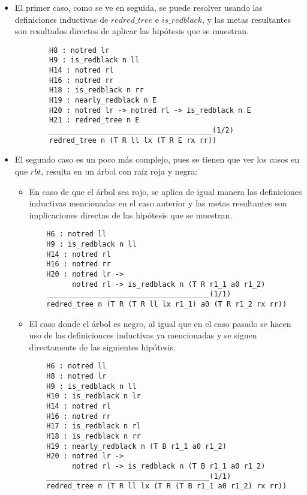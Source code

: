 \begin{itemize}
    \item El primer caso, como se ve en seguida, se puede resolver usando las definiciones
    inductivas de \hyperref[inductive_isRedB]{$redred\_tree$} e 
    \hyperref[inductive_isRedB]{$is\_redblack$}, y las metas resultantes son resultados directos de 
    aplicar las hipótesis que se muestran.
    \begin{verbatim}
        H8 : notred lr
        H9 : is_redblack n ll
        H14 : notred rl
        H16 : notred rr
        H18 : is_redblack n rr
        H19 : nearly_redblack n E
        H20 : notred lr -> notred rl -> is_redblack n E
        H21 : redred_tree n E
        ______________________________________(1/2)
        redred_tree n (T R ll lx (T R E rx rr))
    \end{verbatim}
    \item El segundo caso es un poco m\'as complejo, pues se tienen que ver los casos en que $rbt$,
    resulta en un \'arbol con raíz roja y negra:
    \begin{itemize}
        \item En caso de que el \'arbol sea rojo, se aplica de igual manera las definiciones
        inductivas mencionadas en el caso anterior y las metas resultantes son implicaciones
        directas de las hipótesis que se muestran.
    \begin{verbatim}
    H6 : notred ll
    H9 : is_redblack n ll
    H14 : notred rl
    H16 : notred rr
    H20 : notred lr ->
          notred rl -> is_redblack n (T R r1_1 a0 r1_2)
    ______________________________________(1/1)
    redred_tree n (T R (T R ll lx r1_1) a0 (T R r1_2 rx rr))
    \end{verbatim}
        \item El caso donde el \'arbol es negro, al igual que en el caso pasado se hacen uso de
        las definicionces inductivas ya mencionadas y se siguen directamente de las siguientes
        hipótesis.
    \begin{verbatim}
    H6 : notred ll
    H8 : notred lr
    H9 : is_redblack n ll
    H10 : is_redblack n lr
    H14 : notred rl
    H16 : notred rr
    H17 : is_redblack n rl
    H18 : is_redblack n rr
    H19 : nearly_redblack n (T B r1_1 a0 r1_2)
    H20 : notred lr ->
          notred rl -> is_redblack n (T B r1_1 a0 r1_2)
    ______________________________________(1/1)
    redred_tree n (T R ll lx (T R (T B r1_1 a0 r1_2) rx rr))
    \end{verbatim}
    \end{itemize}
\end{itemize}

